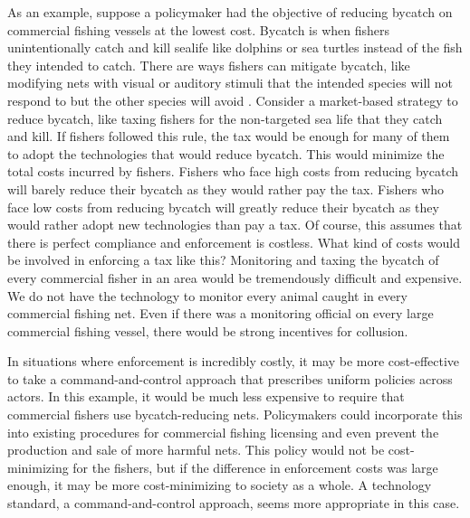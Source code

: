 As an example, suppose a policymaker had the objective of reducing bycatch on commercial fishing vessels at the lowest cost. Bycatch is when fishers unintentionally catch and kill sealife like dolphins or sea turtles instead of the fish they intended to catch. There are ways fishers can mitigate bycatch, like modifying nets with visual or auditory stimuli that the intended species will not respond to but the other species will avoid \citep[for example, see][]{bielli2020illuminating}. Consider a market-based strategy to reduce bycatch, like taxing fishers for the non-targeted sea life that they catch and kill. If fishers followed this rule, the tax would be enough for many of them to adopt the technologies that would reduce bycatch. This would minimize the total costs incurred by fishers. Fishers who face high costs from reducing bycatch will barely reduce their bycatch as they would rather pay the tax. Fishers who face low costs from reducing bycatch will greatly reduce their bycatch as they would rather adopt new technologies than pay a tax. Of course, this assumes that there is perfect compliance and enforcement is costless. What kind of costs would be involved in enforcing a tax like this? Monitoring and taxing the bycatch of every commercial fisher in an area would be tremendously difficult and expensive. We do not have the technology to monitor every animal caught in every commercial fishing net. Even if there was a monitoring official on every large commercial fishing vessel, there would be strong incentives for collusion. 

In situations where enforcement is incredibly costly, it may be more cost-effective to take a command-and-control approach that prescribes uniform policies across actors. In this example, it would be much less expensive to require that commercial fishers use bycatch-reducing nets. Policymakers could incorporate this into existing procedures for commercial fishing licensing and even prevent the production and sale of more harmful nets. This policy would not be cost-minimizing for the fishers, but if the difference in enforcement costs was large enough, it may be more cost-minimizing to society as a whole. A technology standard, a command-and-control approach, seems more appropriate in this case.

